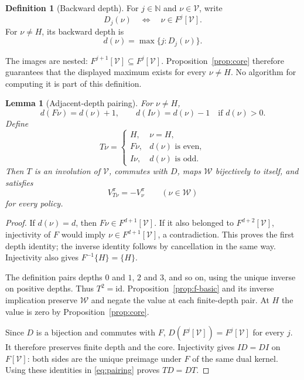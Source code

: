 \documentclass[11pt]{article}
\newtheorem{lemma}[theorem]{Lemma}
\theoremstyle{definition}
\newtheorem{definition}{Definition}
\theoremstyle{remark}
\newcommand{\N}{\mathbb N}
\newcommand{\V}{\mathcal V}
\newcommand{\W}{\mathcal W}
\newcommand{\id}{\mathrm{id}}
\begin{document}
\begin{definition}[Backward depth]
\label{def:depth}
For $j\in\N$ and $\nu\in\V$, write
\[
  D_j(\nu)\quad\Longleftrightarrow\quad\nu\in F^j[\V].
\]
For $\nu\ne H$, its backward depth is
\[
  d(\nu)=\max\{j:D_j(\nu)\}.
\]
\end{definition}

The images are nested: $F^{j+1}[\V]\subseteq F^j[\V]$.
Proposition~\ref{prop:core} therefore guarantees that the displayed
maximum exists for every $\nu\ne H$.  No algorithm for computing it
is part of this definition.

\begin{lemma}[Adjacent-depth pairing]
\label{lem:pairing}
For $\nu\ne H$,
\[
  d(F\nu)=d(\nu)+1,
  \qquad
  d(I\nu)=d(\nu)-1\quad\text{if }d(\nu)>0.
\]
Define
\begin{equation}
  T\nu=
  \begin{cases}
    H,&\nu=H,\\
    F\nu,&d(\nu)\text{ is even},\\
    I\nu,&d(\nu)\text{ is odd}.
  \end{cases}
  \label{eq:pairing}
\end{equation}
Then $T$ is an involution of $\V$, commutes with $D$, maps $\W$
bijectively to itself, and satisfies
\begin{equation}
  V_{T\nu}^{\pi}=-V_\nu^\pi
  \qquad(\nu\in\W)
  \label{eq:t-antivalue}
\end{equation}
for every policy.
\end{lemma}

\begin{proof}
If $d(\nu)=d$, then $F\nu\in F^{d+1}[\V]$.  If it also belonged
to $F^{d+2}[\V]$, injectivity of $F$ would imply
$\nu\in F^{d+1}[\V]$, a contradiction.  This proves the first
depth identity; the inverse identity follows by cancellation in the
same way.  Injectivity also gives $F^{-1}\{H\}=\{H\}$.

The definition pairs depths $0$ and $1$, $2$ and $3$, and so on,
using the unique inverse on positive depths.  Thus $T^2=\id$.
Proposition~\ref{prop:f-basic} and its inverse implication preserve
$\W$ and negate the value at each finite-depth pair.  At $H$ the
value is zero by Proposition~\ref{prop:core}.

Since $D$ is a bijection and commutes with $F$,
$D(F^j[\V])=F^j[\V]$ for every $j$.  It therefore preserves finite
depth and the core.  Injectivity gives $ID=DI$ on $F[\V]$:
both sides are the unique preimage under $F$ of the same dual kernel.
Using these identities in \eqref{eq:pairing} proves $TD=DT$.
\end{proof}
\end{document}
